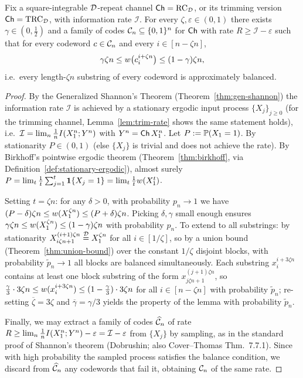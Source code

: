 \begin{proposition}
  \label{prop:approx-balance}
  Fix a square-integrable $\mathcal{D}$-repeat channel $\mathsf{Ch}=\mathrm{RC}_{\mathcal{D}}$, or its trimming
  version $\mathsf{Ch}=\mathrm{TRC}_{\mathcal{D}}$, with information rate $\mathcal{I}$. For every
  $\zeta,\varepsilon\in(0,1)$ there exists $\gamma\in(0,\tfrac12)$ and a family of
  codes $\mathcal{C}_n\subseteq\{0,1\}^n$ for $\mathsf{Ch}$ with rate
  $R\ge\mathcal{I}-\varepsilon$ such that for every codeword $c\in\mathcal{C}_n$ and
  every $i\in[n-\zeta n]$,
  \[
    \gamma\zeta n \le w\big(c_i^{i+\zeta n}\big) \le (1-\gamma)\zeta n,
  \]
  i.e.\ every length-$\zeta n$ substring of every codeword is approximately
  balanced.
\end{proposition}
\begin{proof}
  By the Generalized Shannon's Theorem (Theorem~\ref{thm:gen-shannon}) the
  information rate $\mathcal{I}$ is achieved by a stationary ergodic input process
  $\{X_j\}_{j\ge0}$ (for the trimming channel, Lemma~\ref{lem:trim-rate} shows the
  same statement holds), i.e.\ $\mathcal{I}=\lim_n\tfrac1n I(X_1^n;Y^n)$ with
  $Y^n=\mathsf{Ch}\,X_1^n$. Let $P:=\mathbb{P}(X_1=1)$. By stationarity $P\in(0,1)$ (else
  $\{X_j\}$ is trivial and does not achieve the rate). By Birkhoff's pointwise
  ergodic theorem (Theorem~\ref{thm:birkhoff}, via
  Definition~\ref{def:stationary-ergodic}), almost surely
  $P=\lim_{t}\tfrac1t\sum_{j=1}^t\mathbf{1}\{X_j=1\}=\lim_t\tfrac1tw(X_1^t)$.

  Setting $t=\zeta n$: for any $\delta>0$, with probability $p_n\to1$ we have
  $(P-\delta)\zeta n\le w(X_1^{\zeta n})\le(P+\delta)\zeta n$. Picking
  $\delta,\gamma$ small enough ensures $\gamma\zeta n\le w(X_1^{\zeta n})
   \le(1-\gamma)\zeta n$ with probability $p_n$. To extend to all substrings:
  by stationarity $X_{i\zeta n+1}^{(i+1)\zeta n}\overset{\mathcal{D}}{=}X_1^{\zeta n}$
  for all $i\in[1/\zeta]$, so by a union bound (Theorem~\ref{thm:union-bound})
  over the constant $1/\zeta$ disjoint blocks, with probability
  $\widetilde p_n\to1$ all blocks are balanced simultaneously. Each substring
  $x_i^{i+3\zeta n}$ contains at least one block substring of the form
  $x_{j\zeta n+1}^{(j+1)\zeta n}$, so
  $\tfrac{\gamma}{3}\cdot3\zeta n\le w(x_i^{i+3\zeta n})\le(1-\tfrac{\gamma}{3})
   \cdot3\zeta n$ for all $i\in[n-\zeta n]$ with probability $\widetilde p_n$;
  re-setting $\overline\zeta=3\zeta$ and $\overline\gamma=\gamma/3$ yields the
  property of the lemma with probability $\widetilde p_n$.

  Finally, we may extract a family of codes $\widehat{\mathcal{C}}_n$ of rate
  $R\ge\lim_n\tfrac1n I(X_1^n;Y^n)-\varepsilon=\mathcal{I}-\varepsilon$ from
  $\{X_j\}$ by sampling, as in the standard proof of Shannon's theorem (Dobrushin;
  also Cover--Thomas Thm.\ 7.7.1). Since with high probability the sampled process
  satisfies the balance condition, we discard from $\widehat{\mathcal{C}}_n$ any codewords
  that fail it, obtaining $\mathcal{C}_n$ of the same rate.
\end{proof}


